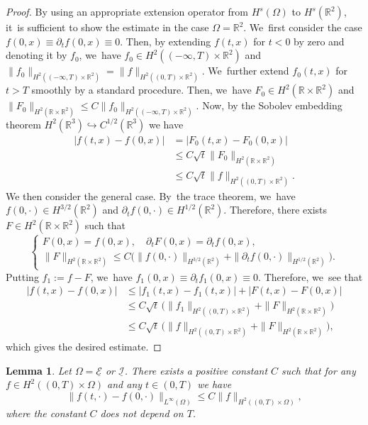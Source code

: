 \documentclass[JEP,XML,SOM,Unicode,NoFloatCountersInSection,published]{cedram}
\newcommand{\R}{{\mathbb R}}
\newcommand{\dt}{\partial_t}
\newcommand{\cI}{{\mathcal I}}
\newcommand{\cE}{{\mathcal E}}
\newcommand{\ul}[1]{\underline{#1}}
\newtheorem{lemma}[theorem]{Lemma}
\theoremstyle{definition}
\begin{document}
\begin{proof}
By using an appropriate extension operator from $H^s(\Omega)$ to $H^s(\R^2)$, it~is sufficient to show the estimate in the case $\Omega=\R^2$. We~first consider the case $f(0,x)\equiv \dt f(0,x)\equiv0$.
Then, by extending $f(t,x)$ for $t<0$ by zero and denoting it by $f_0$, we~have $f_0\in H^2((-\infty,T)\times\R^2)$ and $\|f_0\|_{H^2((-\infty,T)\times\R^2)}=\|f\|_{H^2((0,T)\times\R^2)}$. We~further extend $f_0(t,x)$ for $t>T$ smoothly by a standard procedure.
Then, we~have $F_0\in H^2(\R\times\R^2)$ and
$\|F_0\|_{H^2(\R\times\R^2)} \leq C\|f_0\|_{H^2((-\infty,T)\times\R^2)}$.
Now, by the Sobolev embedding theorem $H^2(\R^3) \hookrightarrow C^{1/2}(\R^3)$ we have
\begin{align*}
|f(t,x)-f(0,x)|
&= |F_0(t,x)-F_0(0,x)| \\
&\leq C\sqrt{t}\|F_0\|_{H^2(\R\times\R^2)} \\
&\leq C\sqrt{t}\|f\|_{H^2((0,T)\times\R^2)}.
\end{align*}
We then consider the general case. By~the trace theorem, we~have $f(0,\cdot) \in H^{3/2}(\R^2)$ and $\dt f(0,\cdot) \in H^{1/2}(\R^2)$.
Therefore, there exists $F\in H^2(\R\times\R^2)$ such that
\[
\begin{cases}
F(0,x)=f(0,x), \quad \dt F(0,x)=\dt f(0,x), \\
\|F\|_{H^2(\R\times\R^2)}
\leq C(\|f(0,\cdot)\|_{H^{3/2}(\R^2)} + \|\dt f(0,\cdot)\|_{H^{1/2}(\R^2)} \bigr).
\end{cases}
\]
Putting $f_1:=f-F$, we~have $f_1(0,x)\equiv \dt f_1(0,x)\equiv0$.
Therefore, we~see that
\begin{align*}
|f(t,x)-f(0,x)|
&\leq |f_1(t,x)-f_1(t,x)| + |F(t,x)-F(0,x)| \\
&\leq C\sqrt{t}\, \bigl(\|f_1\|_{H^2((0,T)\times\R^2)} + \|F\|_{H^2(\R\times\R^2)} \bigr) \\
&\leq C\sqrt{t}\, \bigl(\|f\|_{H^2((0,T)\times\R^2)} + \|F\|_{H^2(\R\times\R^2)} \bigr),
\end{align*}
which gives the desired estimate.
\end{proof}

\begin{lemma}\label{lem:Embedding2}
Let $\Omega=\ul{\cE}$ or $\ul{\cI}$.
There exists a positive constant $C$ such that for any $f\in H^2((0,T)\times\Omega)$
and any $t\in(0,T)$ we have
\[
\|f(t,\cdot)-f(0,\cdot)\|_{L^\infty(\Omega)} \leq C \|f\|_{H^2((0,T)\times\Omega)},
\]
where the constant $C$ does not depend on $T$.
\end{lemma}
\end{document}
